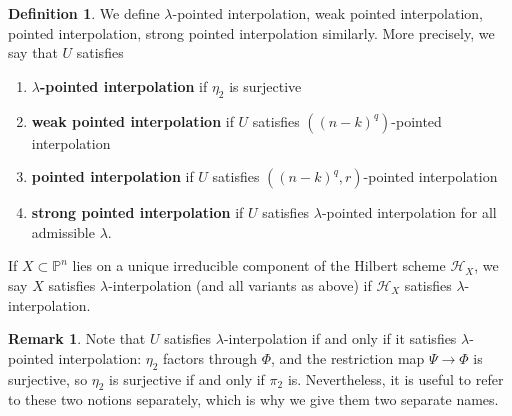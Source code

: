 \documentclass[reqno, 11pt]{amsart}
\theoremstyle{definition}
\theoremstyle{remark}
\numberwithin{equation}{section}
\numberwithin{thm}{section}
\numberwithin{prop}{section}
\numberwithin{lem}{section}
\numberwithin{cor}{section}
\numberwithin{conj}{section}
\numberwithin{defn}{section}
\theoremstyle{plain}
\theoremstyle{definition}
\newtheorem{definition}[theorem]{Definition}
\newtheorem{remark}[theorem]{Remark}
\newcommand\bp{{\mathbb P}}
\newcommand\sch{\mathscr H}
\newcommand \hilb[1]{\sch_{#1}}
\begin{document}
\begin{definition}
We define  $\lambda$-pointed interpolation, weak pointed interpolation, pointed interpolation, strong pointed interpolation similarly. More precisely, we say that $U$ satisfies
\begin{enumerate}
	\item {\bf $\lambda$-pointed interpolation} if $\eta_2$
is surjective
\item {\bf weak pointed interpolation} if $U$ satisfies
	$\left( (n - k)^q \right)$-pointed interpolation
\item {\bf pointed interpolation} if $U$ satisfies
$\left( (n - k)^q, r \right)$-pointed interpolation
\item {\bf strong pointed interpolation} if $U$ satisfies
$\lambda$-pointed interpolation for all admissible $\lambda$.
\end{enumerate}

If $X \subset \bp^n$ lies on a unique irreducible
component of the Hilbert scheme $\hilb X$, we say $X$ satisfies $\lambda$-interpolation (and all variants as
above) if $\hilb X$ satisfies $\lambda$-interpolation.
\end{definition}
\begin{remark}
	\label{remark:pointed-interpolation-equivalent-to-non-pointed}
	Note that $U$ satisfies $\lambda$-interpolation if and only if it satisfies $\lambda$-pointed interpolation:
	$\eta_2$ factors through $\Phi$,
	and the restriction map $\Psi \rightarrow \Phi$ is surjective,
	so $\eta_2$ is surjective if and only if $\pi_2$ is.
	Nevertheless, it is useful to refer to these two notions separately, which is why we give
	them two separate names.
\end{remark}
\end{document}
